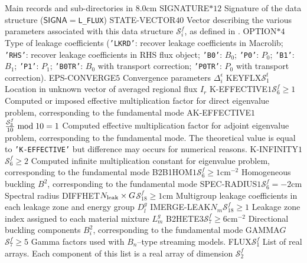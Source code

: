 \begin{DescriptionEnregistrement}{Main records and sub-directories in }{8.0cm}
\CharEnr
  {SIGNATURE}{$*12$}
  {Signature of the data structure ($\mathsf{SIGNA}=${\tt L\_FLUX})}
\IntEnr
  {STATE-VECTOR}{$40$}
  {Vector describing the various parameters associated with this data structure $\mathcal{S}^{f}_{i}$,
  as defined in .}
\CharEnr
  {OPTION}{$*4$}
  {Type of leakage coefficients ({\tt 'LKRD'}: recover leakage coefficients in Macrolib; {\tt 'RHS'}: recover
  leakage coefficients in RHS flux object; {\tt 'B0'}: $B_0$; {\tt 'P0'}: $P_0$; {\tt 'B1'}: $B_1$; {\tt 'P1'}:
   $P_1$; {\tt 'B0TR'}: $B_0$ with transport correction; {\tt 'P0TR'}: $P_0$ with transport correction).}
\RealEnr
  {EPS-CONVERGE}{$5$}{}
  {Convergence parameters $\Delta_i^\epsilon$}
\IntEnr
  {KEYFLX}{$\mathcal{S}^{t}_{1}$}
  {Location in unknown vector of averaged regional flux $I_{r}$}
\OptRealEnr
  {K-EFFECTIVE}{$1$}{$\mathcal{S}^{f}_{6}\ge 1$}{}
  {Computed or imposed effective multiplication factor for direct eigenvalue problem,
  corresponding to the fundamental mode}
\OptRealEnr
  {AK-EFFECTIVE}{$1$}{${\mathcal{S}^{f}_{3}\over 10} \bmod 10 = 1$}{}
  {Computed effective multiplication factor for adjoint eigenvalue problem,
  corresponding to the fundamental mode.
  The theoretical value is equal
  to {\tt 'K-EFFECTIVE'} but difference may occurs for numerical reasons.}
\OptRealEnr
  {K-INFINITY}{$1$}{$\mathcal{S}^{f}_{6}\ge 2$}{}
  {Computed infinite multiplication constant for eigenvalue problem,
  corresponding to the fundamental mode}
\OptRealEnr
  {B2B1HOM}{$1$}{$\mathcal{S}^{f}_{6}\ge 1$}{cm$^{-2}$}
  {Homogeneous buckling $B^{2}$,
  corresponding to the fundamental mode}
\OptRealEnr
  {SPEC-RADIUS}{$1$}{$\mathcal{S}^{f}_{6}= -2$}{cm}
  {Spectral radius}
\OptRealEnr
  {DIFFHET}{$N_{\rm leak}\times G$}{$\mathcal{S}^{f}_{18}\ge 1$}{cm}
  {Multigroup leakage coefficients in each leakage zone and energy group $D_l^g$}
\OptIntEnr
  {IMERGE-LEAK}{$N_m$}{$\mathcal{S}^{f}_{18}\ge 1$}
  {Leakage zone index assigned to each material mixture $L_m^g$}
\OptRealEnr
  {B2HETE}{$3$}{$\mathcal{S}^{f}_{7} \ge 6$}{cm$^{-2}$}
  {Directional buckling components $B^{2}_{i}$,
  corresponding to the fundamental mode}
\OptRealEnr
  {GAMMA}{$G$}{$\mathcal{S}^{f}_{7}\ge 5$}{}
  {Gamma factors used with $B_n$--type streaming models.}
\DirlEnr
  {FLUX}{$\mathcal{S}^{f}_{1}$}
  {List of real arrays. Each component of this list is a real array of dimension $\mathcal{S}^{f}_{2}$
}
\end{DescriptionEnregistrement}
